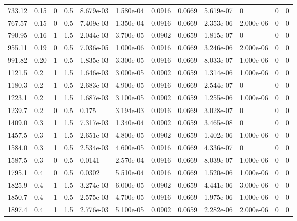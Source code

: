 \documentclass[preview]{standalone}
\begin{document}
{{\begin{tabular}{L{1.2cm}C{1.2cm} C{0.3cm}C{0.5cm} C{1.4cm}C{1.4cm} C{1.4cm}C{1.4cm} C{1.6cm}C{1.6cm} C{1.6cm}C{1.6cm}}
  733.12  &  0.15  & 0     & 0.5 &  8.679e-03  & 1.580e-04  &  0.0916&   0.0669& 5.619e-07 & 0   &  0 & 0  \\ 
  767.57  &  0.15  & 0     & 0.5 &  7.409e-03  & 1.350e-04  &  0.0916&   0.0669& 2.353e-06 & 2.000e-06   &  0 & 0  \\ 
  790.95  &  0.16  & 1     & 1.5 &  2.044e-03  & 3.700e-05  &  0.0902&   0.0659& 1.815e-07 & 0   &  0 & 0  \\ 
  955.11  &  0.19  & 0     & 0.5 &  7.036e-05  & 1.000e-06  &  0.0916&   0.0669& 3.246e-06 & 2.000e-06   &  0 & 0  \\ 
  991.82  &  0.20  & 1     & 0.5 &  1.835e-03  & 3.300e-05  &  0.0916&   0.0669& 8.033e-07 & 1.000e-06   &  0 & 0  \\ 
  1121.5  &   0.2  & 1     & 1.5 &  1.646e-03  & 3.000e-05  &  0.0902&   0.0659& 1.314e-06 & 1.000e-06   &  0 & 0  \\ 
  1180.3  &   0.2  & 1     & 0.5 &  2.683e-03  & 4.900e-05  &  0.0916&   0.0669& 2.544e-07 & 0   &  0 & 0  \\ 
  1223.1  &   0.2  & 1     & 1.5 &  1.687e-03  & 3.100e-05  &  0.0902&   0.0659& 1.255e-06 & 1.000e-06   &  0 & 0  \\ 
  1239.7  &   0.2  & 0     & 0.5 &  0.175  & 3.194e-03  &  0.0916&   0.0669& 3.028e-07 & 0   &  0 & 0  \\ 
  1409.0  &   0.3  & 1     & 1.5 &  7.317e-03  & 1.340e-04  &  0.0902&   0.0659& 3.465e-08 & 0   &  0 & 0  \\ 
  1457.5  &   0.3  & 1     & 1.5 &  2.651e-03  & 4.800e-05  &  0.0902&   0.0659& 1.402e-06 & 1.000e-06   &  0 & 0  \\ 
  1584.0  &   0.3  & 1     & 0.5 &  2.534e-03  & 4.600e-05  &  0.0916&   0.0669& 4.336e-07 & 0   &  0 & 0  \\ 
  1587.5  &   0.3  & 0     & 0.5 &  0.0141  & 2.570e-04  &  0.0916&   0.0669& 8.039e-07 & 1.000e-06   &  0 & 0  \\ 
  1795.1  &   0.4  & 0     & 0.5 &  0.0302  & 5.510e-04  &  0.0916&   0.0669& 1.520e-06 & 1.000e-06   &  0 & 0  \\ 
  1825.9  &   0.4  & 1     & 1.5 &  3.274e-03  & 6.000e-05  &  0.0902&   0.0659& 4.441e-06 & 3.000e-06   &  0 & 0  \\ 
  1850.7  &   0.4  & 1     & 0.5 &  2.575e-03  & 4.700e-05  &  0.0916&   0.0669& 1.975e-06 & 1.000e-06   &  0 & 0  \\ 
  1897.4  &   0.4  & 1     & 1.5 &  2.776e-03  & 5.100e-05  &  0.0902&   0.0659& 2.282e-06 & 2.000e-06   &  0 & 0  \\ 

\end{tabular}}}
\end{document}
